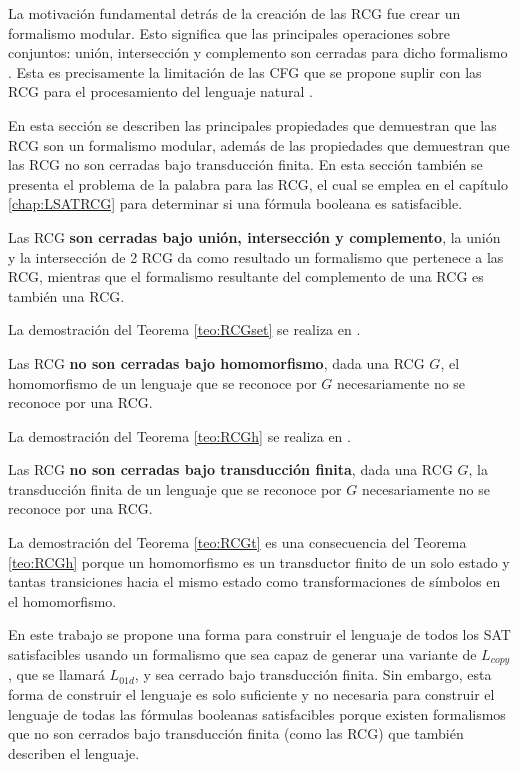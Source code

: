 La motivación fundamental detrás de la creación de las RCG fue crear un formalismo modular. Esto significa que las principales operaciones sobre conjuntos: unión, intersección y complemento son cerradas para dicho formalismo \cite{mainRCGBib}.  Esta es precisamente la limitación de las CFG que se propone suplir con las RCG para el procesamiento del lenguaje natural \cite{mainRCGBib}.

En esta sección se describen las principales propiedades que demuestran que las RCG son un formalismo
modular, además de las propiedades que demuestran que las RCG no son cerradas 
bajo transducción finita. En esta sección también se presenta el problema de la palabra 
para las RCG, el cual se emplea en el capítulo \ref{chap:LSATRCG} para determinar si una fórmula booleana es satisfacible.

\begin{theorem}
    \label{teo:RCGset}
    Las RCG \textbf{son cerradas bajo unión, intersección y complemento}, la unión y la intersección de 2 RCG da como resultado un formalismo que pertenece a las RCG, mientras
    que el formalismo resultante del complemento de una RCG es también una RCG.
\end{theorem}

La demostración del Teorema \ref{teo:RCGset} se realiza en \cite{mainRCGBib}.

\begin{theorem}
    \label{teo:RCGh}
    Las RCG \textbf{no son cerradas bajo homomorfismo}, dada una RCG $G$, el homomorfismo de un lenguaje que se reconoce por $G$ necesariamente no se reconoce por una RCG.    
\end{theorem}

La demostración del Teorema \ref{teo:RCGh} se realiza en \cite{propertiesRCGBib}.

\begin{theorem}
    \label{teo:RCGt}
    Las RCG \textbf{no son cerradas bajo transducción finita}, dada una RCG $G$, la transducción finita de un lenguaje que se reconoce por $G$ necesariamente no se reconoce por una RCG.    
\end{theorem}

La demostración del Teorema \ref{teo:RCGt} es una consecuencia del Teorema \ref{teo:RCGh} porque un homomorfismo es un transductor finito de un solo estado y tantas transiciones hacia el mismo estado como transformaciones de símbolos en el homomorfismo.

En este trabajo se propone una forma para construir el lenguaje de todos los SAT satisfacibles usando un formalismo que sea capaz de generar una variante de $L_{copy}$, que se llamará $L_{01d}$, y sea cerrado bajo transducción finita. Sin embargo, esta forma de construir el lenguaje es solo suficiente y no necesaria para construir el lenguaje de todas las fórmulas booleanas satisfacibles porque existen formalismos que no son cerrados bajo transducción finita (como las RCG) que también describen el lenguaje.



